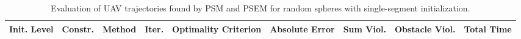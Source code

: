 \begin{table}
\small

\caption{Evaluation of UAV trajectories found by PSM and PSEM for random spheres with single-segment initialization.}
\label{tab:traj-plan-eval-random_spheres-single}
\begin{tabular}{p{21mm}p{9mm}p{12mm}p{6mm}p{14mm}p{14mm}p{14mm}p{14mm}p{14mm}}
\toprule
Init. Level & Constr. & Method & Iter. & Optimality Criterion & Absolute Error & Sum Viol. & Obstacle Viol. & Total Time \\
\midrule
\bottomrule
\end{tabular}
\end{table}
